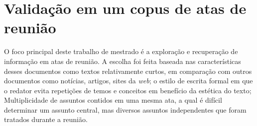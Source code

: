 
















\section{Validação em um copus de atas de reunião}	
\label{sec:aplicacao-sistema}

O foco principal deste trabalho de mestrado é a exploração e recuperação de informação em atas de reunião. A escolha foi feita baseada nas características desses documentos como textos relativamente curtos, em comparação com outros documentos como notícias, artigos, sites da \textit{web}; o estilo de escrita formal em que o redator evita repetições de temos e conceitos em benefício da estética do texto; Multiplicidade de assuntos contidos em uma mesma ata, a qual é difícil determinar um assunto central, mas diversos assuntos independentes que foram tratados durante a reunião.





